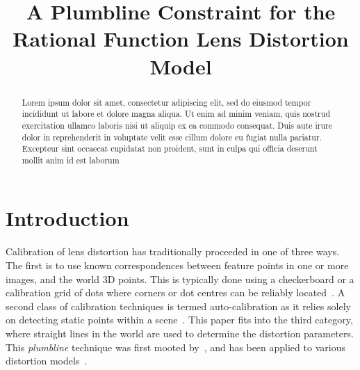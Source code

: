 \documentclass[extendedabs]{bmvc2k}
\begin{document}
\title{A Plumbline Constraint for the Rational Function Lens Distortion Model}

%

\maketitle

\begin{abstract}
 Lorem ipsum dolor sit amet, consectetur adipiscing elit, sed do eiusmod tempor incididunt ut labore et dolore magna aliqua. Ut enim ad minim veniam, quis nostrud exercitation ullamco laboris nisi ut aliquip ex ea commodo consequat. Duis aute irure dolor in reprehenderit in voluptate velit esse cillum dolore eu fugiat nulla pariatur. Excepteur sint occaecat cupidatat non proident, sunt in culpa qui officia deserunt mollit anim id est laborum
\end{abstract}

\section{Introduction}

\noindent
Calibration of lens distortion has traditionally proceeded in one
of three ways.  The first is to use known correspondences between
feature points in one or more images, and the world 3D points.
This is typically done using a checkerboard or a calibration grid
of dots where corners or dot centres can be reliably
located~\cite{Tsai86}. A second class of calibration techniques is
termed auto-calibration as it relies solely on detecting static
points within a scene~\cite{Zhang96,Fitzgibbon01}.  This paper fits
into the third category, where straight lines in the world are used
to determine the distortion parameters.  This {\em plumbline}
technique was first mooted by~\cite{Brown71}, and has been applied
to various distortion models~\cite{Devernay01,Swaminathan00}.
\end{document}
